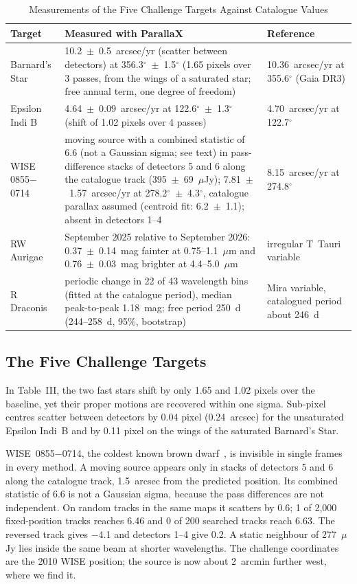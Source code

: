 \documentclass[conference]{IEEEtran}
\begin{document}
\begin{table}[t]
\caption{Measurements of the Five Challenge Targets Against Catalogue Values}
\label{tab:targets}
\centering
\footnotesize
\begin{tabular}{@{}p{}p{}p{}@{}}
\toprule
Target & Measured with ParallaX & Reference \\
\midrule
Barnard's Star & 10.2~$\pm$~0.5~arcsec/yr (scatter between detectors) at 356.3$^\circ$~$\pm$~1.5$^\circ$ (1.65 pixels over 3 passes, from the wings of a saturated star; free annual term, one degree of freedom) & 10.36~arcsec/yr at 355.6$^\circ$ (Gaia DR3) \\
Epsilon Indi B & 4.64~$\pm$~0.09~arcsec/yr at 122.6$^\circ$~$\pm$~1.3$^\circ$ (shift of 1.02 pixels over 4 passes) & 4.70~arcsec/yr at 122.7$^\circ$ \\
WISE 0855$-$0714 & moving source with a combined statistic of 6.6 (not a Gaussian sigma; see text) in pass-difference stacks of detectors 5 and 6 along the catalogue track (395~$\pm$~69~$\mu$Jy); 7.81~$\pm$~1.57~arcsec/yr at 278.2$^\circ$~$\pm$~4.3$^\circ$, catalogue parallax assumed (centroid fit: 6.2~$\pm$~1.1); absent in detectors 1--4 & 8.15~arcsec/yr at 274.8$^\circ$ \\
RW Aurigae & September 2025 relative to September 2026: 0.37~$\pm$~0.14~mag fainter at 0.75--1.1~$\mu$m and 0.76~$\pm$~0.03~mag brighter at 4.4--5.0~$\mu$m & irregular T~Tauri variable \\
R Draconis & periodic change in 22 of 43 wavelength bins (fitted at the catalogue period), median peak-to-peak 1.18~mag; free period 250~d (244--258~d, 95\%, bootstrap) & Mira variable, catalogued period about 246~d \\
\bottomrule
\end{tabular}
\end{table}

\subsection{The Five Challenge Targets}

In Table~III, the two fast stars shift by only 1.65 and 1.02 pixels over the baseline, yet their proper motions are recovered within one sigma. Sub-pixel centres scatter between detectors by 0.04 pixel (0.24~arcsec) for the unsaturated Epsilon Indi~B and by 0.11 pixel on the wings of the saturated Barnard's Star.

WISE~0855$-$0714, the coldest known brown dwarf~\cite{luhman2014wise0855}, is invisible in single frames in every method. A moving source appears only in stacks of detectors 5 and 6 along the catalogue track, 1.5~arcsec from the predicted position. Its combined statistic of 6.6 is not a Gaussian sigma, because the pass differences are not independent. On random tracks in the same maps it scatters by 0.6; 1 of 2,000 fixed-position tracks reaches 6.46 and 0 of 200 searched tracks reach 6.63. The reversed track gives $-$4.1 and detectors 1--4 give 0.2. A static neighbour of 277~$\mu$Jy lies inside the same beam at shorter wavelengths. The challenge coordinates are the 2010 WISE position; the source is now about 2~arcmin further west, where we find it.
\end{document}
